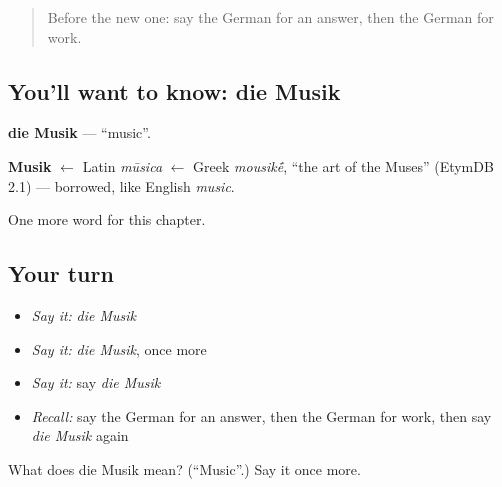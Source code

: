 \label{lesson:GE-C102-musik}



\begin{quote}
Before the new one: say the German for an answer, then the German for work.
\end{quote}

\subsection*{You'll want to know: die Musik}
\textbf{die Musik} — \textquotedblleft{}music\textquotedblright{}.

\begin{cousinweb}
\textbf{Musik} $\leftarrow$ Latin \emph{mūsica} $\leftarrow$ Greek \emph{mousik\'{\={e}}}, \textquotedblleft{}the art of the Muses\textquotedblright{} (EtymDB 2.1) — borrowed, like English \emph{music}.
\end{cousinweb}

\begin{grammarlens}[title={What you've built}]
One more word for this chapter.
\end{grammarlens}

\subsection*{Your turn}
\begin{itemize}
\raggedright
  \item \emph{Say it:} \emph{die Musik}
  \item \emph{Say it:} \emph{die Musik}, once more
  \item \emph{Say it:} say \emph{die Musik}
  \item \emph{Recall:} say the German for an answer, then the German for work, then say \emph{die Musik} again
\end{itemize}

\begin{tcolorbox}[breakable,colback=teal!4,colframe=teal!35!black,title={Before you move on}]
What does die Musik mean? (\textquotedblleft{}Music\textquotedblright{}.) Say it once more.
\end{tcolorbox}
